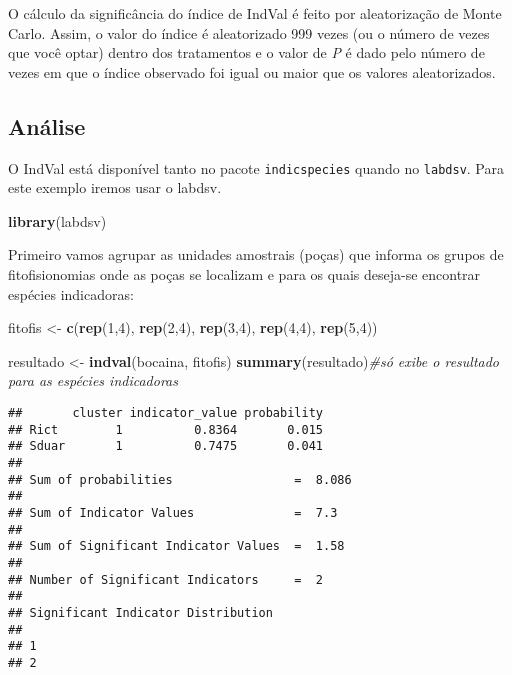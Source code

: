 \documentclass[
]{book}
\newenvironment{Shaded}{\begin{snugshade}}{\end{snugshade}}
\newcommand{\CommentTok}[1]{\textcolor[rgb]{0.56,0.35,0.01}{\textit{#1}}}
\newcommand{\DecValTok}[1]{\textcolor[rgb]{0.00,0.00,0.81}{#1}}
\newcommand{\KeywordTok}[1]{\textcolor[rgb]{0.13,0.29,0.53}{\textbf{#1}}}
\newcommand{\NormalTok}[1]{#1}
\newcommand{\StringTok}[1]{\textcolor[rgb]{0.31,0.60,0.02}{#1}}
\begin{document}
O cálculo da significância do índice de IndVal é feito por aleatorização de Monte Carlo. Assim, o valor do índice é aleatorizado 999 vezes (ou o número de vezes que você optar) dentro dos tratamentos e o valor de \emph{P} é dado pelo número de vezes em que o índice observado foi igual ou maior que os valores aleatorizados.

\hypertarget{anuxe1lise-2}{%
\subsection{Análise}\label{anuxe1lise-2}}

O IndVal está disponível tanto no pacote \texttt{indicspecies} quando no \texttt{labdsv}. Para este exemplo iremos usar o labdsv.

\begin{Shaded}
\begin{Highlighting}[]
\KeywordTok{library}\NormalTok{(labdsv)}
\end{Highlighting}
\end{Shaded}

Primeiro vamos agrupar as unidades amostrais (poças) que informa os grupos de fitofisionomias onde as poças se localizam e para os quais deseja-se encontrar espécies indicadoras:

\begin{Shaded}
\begin{Highlighting}[]
\NormalTok{fitofis <-}\StringTok{ }\KeywordTok{c}\NormalTok{(}\KeywordTok{rep}\NormalTok{(}\DecValTok{1}\NormalTok{,}\DecValTok{4}\NormalTok{), }\KeywordTok{rep}\NormalTok{(}\DecValTok{2}\NormalTok{,}\DecValTok{4}\NormalTok{), }\KeywordTok{rep}\NormalTok{(}\DecValTok{3}\NormalTok{,}\DecValTok{4}\NormalTok{), }\KeywordTok{rep}\NormalTok{(}\DecValTok{4}\NormalTok{,}\DecValTok{4}\NormalTok{), }\KeywordTok{rep}\NormalTok{(}\DecValTok{5}\NormalTok{,}\DecValTok{4}\NormalTok{))}
\end{Highlighting}
\end{Shaded}

\begin{Shaded}
\begin{Highlighting}[]
\NormalTok{resultado <-}\StringTok{ }\KeywordTok{indval}\NormalTok{(bocaina, fitofis)}
\KeywordTok{summary}\NormalTok{(resultado)}\CommentTok{#só exibe o resultado para as espécies indicadoras}
\end{Highlighting}
\end{Shaded}

\begin{verbatim}
##       cluster indicator_value probability
## Rict        1          0.8364       0.015
## Sduar       1          0.7475       0.041
## 
## Sum of probabilities                 =  8.086 
## 
## Sum of Indicator Values              =  7.3 
## 
## Sum of Significant Indicator Values  =  1.58 
## 
## Number of Significant Indicators     =  2 
## 
## Significant Indicator Distribution
## 
## 1 
## 2
\end{verbatim}
\end{document}
